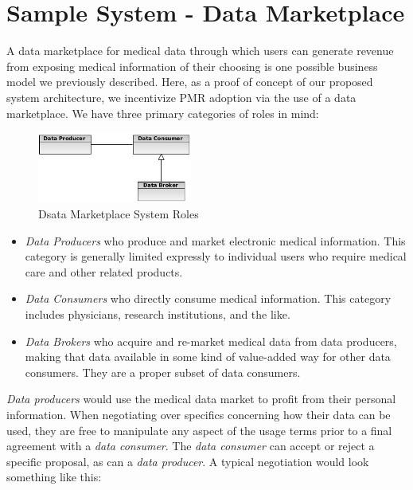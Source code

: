 \documentclass[10pt, conference, compsocconf]{IEEEtran}
\begin{document}
\section{Sample System - Data Marketplace}
A data marketplace for medical data through which users can generate revenue from exposing medical information of their choosing is one possible business model we previously described.  Here, as a proof of concept of our proposed system architecture, we incentivize PMR adoption via the use of a data marketplace.  We have three primary categories of roles in mind:

\begin{figure}[!t]
\centering
\includegraphics[width=2in]{roles}
\caption{Dsata Marketplace System Roles}
\label{fig:SysRoles}
\end{figure}

\begin{itemize}

\item \textit{Data Producers} who produce and market electronic medical information.  This category is generally limited expressly to individual users who require medical care and other related products.

\item \textit{Data Consumers} who directly consume medical information.  This category includes physicians, research institutions, and the like.

\item \textit{Data Brokers} who acquire and re-market medical data from data producers, making that data available in some kind of value-added way for other data consumers.  They are a proper subset of data consumers.

\end{itemize}

\textit{Data producers} would use the medical data market to profit from their personal information.  When negotiating over specifics concerning how their data can be used, they are free to manipulate any aspect of the usage terms prior to a final agreement with a \textit{data consumer}.  The \textit{data consumer} can accept or reject a specific proposal, as can a \textit{data producer}.  A typical negotiation would look something like this:
\end{document}
